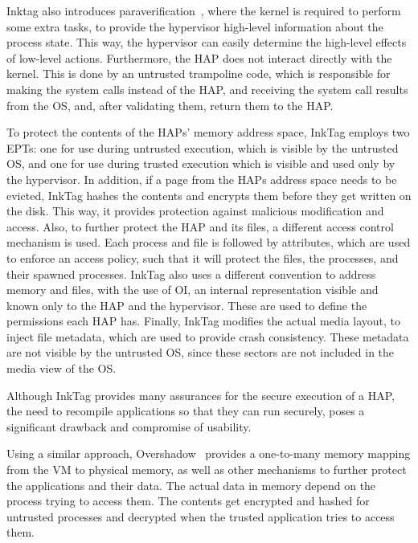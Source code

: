 \par Inktag also introduces paraverification~\cite{hofmann2013inktag}, where the kernel is required to perform some extra tasks, to provide the hypervisor high-level information about the process state. This way, the hypervisor can easily determine the high-level effects of low-level actions. Furthermore, the \ac{HAP} does not interact directly with the kernel. This is done by an untrusted trampoline code, which is responsible for making the system calls instead of the \ac{HAP}, and receiving the system call results from the \ac{OS}, and, after validating them, return them to the \ac{HAP}.

\par To protect the contents of the \ac{HAP}s' memory address space, InkTag employs two \ac{EPT}s: one for use during untrusted execution, which is visible by the untrusted \ac{OS}, and one for use during trusted execution which is visible and used only by the hypervisor. In addition, if a page from the \ac{HAP}s address space needs to be evicted, InkTag hashes the contents and encrypts them before they get written on the disk. This way, it provides protection against malicious modification and access.
Also, to further protect the \ac{HAP} and its files, a different access control mechanism is used. Each process and file is followed by attributes, which are used to enforce an access policy, such that it will protect the files, the processes, and their spawned processes. InkTag also uses a different convention to address memory and files, with the use of \ac{OI}, an internal representation visible and known only to the \ac{HAP} and the hypervisor. These are used to define the permissions each \ac{HAP} has.
Finally, InkTag modifies the actual media layout, to inject file metadata, which are used to provide crash consistency. These metadata are not visible by the untrusted \ac{OS}, since these sectors are not included in the media view of the \ac{OS}. 
\par Although InkTag provides many assurances for the secure execution of a \ac{HAP}, the need to recompile applications so that they can run securely, poses a significant drawback and compromise of usability.

\par Using a similar approach, Overshadow~\cite{chen2008overshadow} provides a one-to-many memory mapping from the \ac{VM} to physical memory, as well as other mechanisms to further protect the applications and their data. The actual data in memory depend on the process trying to access them. The contents get encrypted and hashed for untrusted processes and decrypted when the trusted application tries to access them. 

